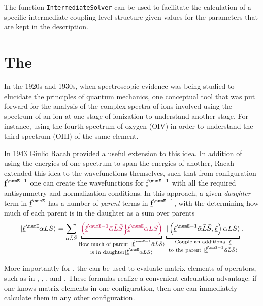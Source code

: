 \documentclass{article}
\newcommand{\codetext}[1]{{\color{BlueViolet} \texttt{#1}}}
\begin{document}
The function \codetext{IntermediateSolver} can be used to facilitate the calculation of a specific intermediate coupling level structure given values for the parameters that are kept in the description.



\section{The \cfps} 

In the 1920s and 1930s, when spectroscopic evidence was being studied to elucidate the principles of quantum mechanics, one conceptual tool that was put forward for the analysis of the complex spectra of ions \cite{bacher_atomic_1934} involved using the spectrum of an ion at one stage of ionization to understand another stage.  For instance, using the fourth spectrum of oxygen (OIV) in order to understand the third spectrum (OIII) of the same element. 

In 1943 Giulio Racah \cite{racah_theory_1943} provided a useful extension to this idea. In addition of using the energies of one spectrum to span the energies of another, Racah extended this idea to the wavefunctions themselves, such that from configuration $\forb^{\numE-1}$ one can create the wavefunctions for $\forb^{\numE-1}$ with all the required antisymmetry and normalization conditions. In this approach, a given \textit{daughter} term in $\forb^{\numE}$ has a number of \textit{parent} terms in $\forb^{\numE-1}$, with the \cfps determining how much of each parent is in the daughter as a sum over parents
\begin{equation}
\ket{\lorb^\numE \alpha LS} = 
	\sum_{\bar{\alpha}\bar{L}
		\bar{S}} 
		\underbracket{\cfp{\lorb^{\numE-1}\bar{\alpha}\bar{L}\bar{S}}
			{\lorb^{\numE}\alpha{LS}}}_
		{\substack{
            \text{How much of parent }\ket{\lorb^{\numE-1}\bar{\alpha}\bar{L}\bar{S}} \\
            \text{is in daughter}\ket{\lorb^{\numE}{\alpha}{L}{S}}
            }
        }
		\underbracket{\ket{\left(\lorb^{\numE-1}\bar{\alpha}\bar{L}\bar{S},\lorb\right)\alpha{LS}}}_
		{\substack{
            \text{Couple an additional $\lorb$} \\
            \text{to the parent }\ket{\lorb^{\numE-1}\bar{\alpha}\bar{L}\bar{S}}
            }
        }.
\end{equation}

More importantly for \qlanth, the \cfps can be used to evaluate matrix elements of operators, such as in , , , and . These formulas realize a convenient calculation advantage: if one knows matrix elements in one configuration, then one can immediately calculate them in any other configuration.
\end{document}
